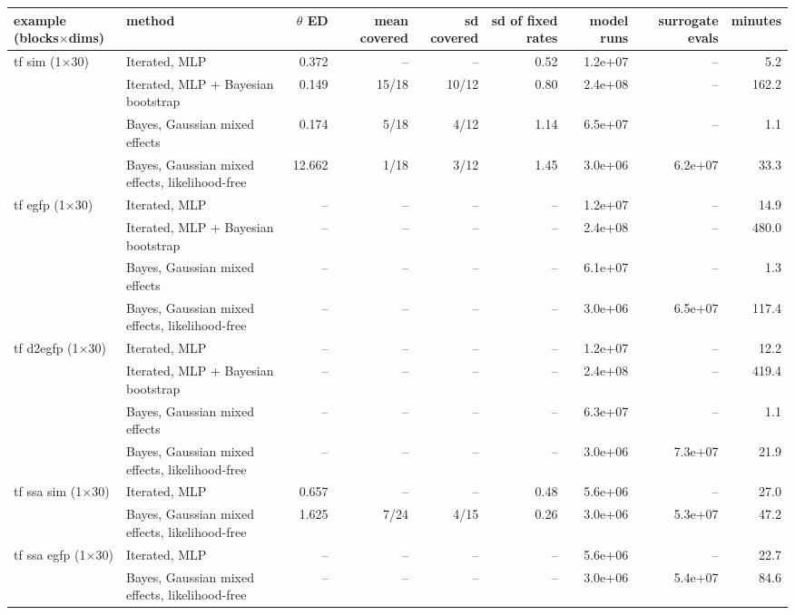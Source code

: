 \begin{tabular}{llrrrrrrr}
\toprule
example (blocks$\times$dims) & method & $\theta$ ED & mean covered & sd covered & sd of fixed rates & model runs & surrogate evals & minutes \\
\midrule
tf sim (1$\times$30) & Iterated, MLP & 0.372 & -- & -- & 0.52 & 1.2e+07 & -- & 5.2 \\
 & Iterated, MLP + Bayesian bootstrap & 0.149 & 15/18 & 10/12 & 0.80 & 2.4e+08 & -- & 162.2 \\
 & Bayes, Gaussian mixed effects & 0.174 & 5/18 & 4/12 & 1.14 & 6.5e+07 & -- & 1.1 \\
 & Bayes, Gaussian mixed effects, likelihood-free & 12.662 & 1/18 & 3/12 & 1.45 & 3.0e+06 & 6.2e+07 & 33.3 \\ \addlinespace
tf egfp (1$\times$30) & Iterated, MLP & -- & -- & -- & -- & 1.2e+07 & -- & 14.9 \\
 & Iterated, MLP + Bayesian bootstrap & -- & -- & -- & -- & 2.4e+08 & -- & 480.0 \\
 & Bayes, Gaussian mixed effects & -- & -- & -- & -- & 6.1e+07 & -- & 1.3 \\
 & Bayes, Gaussian mixed effects, likelihood-free & -- & -- & -- & -- & 3.0e+06 & 6.5e+07 & 117.4 \\ \addlinespace
tf d2egfp (1$\times$30) & Iterated, MLP & -- & -- & -- & -- & 1.2e+07 & -- & 12.2 \\
 & Iterated, MLP + Bayesian bootstrap & -- & -- & -- & -- & 2.4e+08 & -- & 419.4 \\
 & Bayes, Gaussian mixed effects & -- & -- & -- & -- & 6.3e+07 & -- & 1.1 \\
 & Bayes, Gaussian mixed effects, likelihood-free & -- & -- & -- & -- & 3.0e+06 & 7.3e+07 & 21.9 \\ \addlinespace
tf ssa sim (1$\times$30) & Iterated, MLP & 0.657 & -- & -- & 0.48 & 5.6e+06 & -- & 27.0 \\
 & Bayes, Gaussian mixed effects, likelihood-free & 1.625 & 7/24 & 4/15 & 0.26 & 3.0e+06 & 5.3e+07 & 47.2 \\ \addlinespace
tf ssa egfp (1$\times$30) & Iterated, MLP & -- & -- & -- & -- & 5.6e+06 & -- & 22.7 \\
 & Bayes, Gaussian mixed effects, likelihood-free & -- & -- & -- & -- & 3.0e+06 & 5.4e+07 & 84.6 \\
\bottomrule
\end{tabular}
